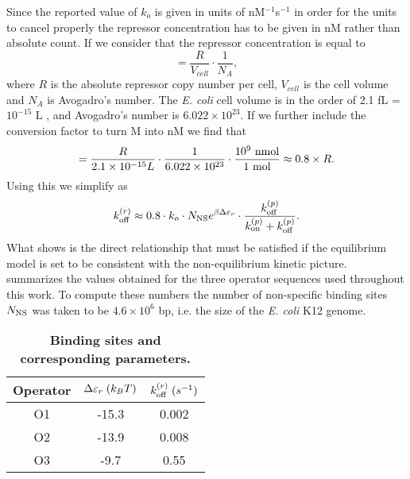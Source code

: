 Since the reported value of $k_o$ is given in units of nM$^{-1}$s$^{-1}$ in
order for the units to cancel properly the repressor concentration has to be
given in nM rather than absolute count. If we consider that the repressor
concentration is equal to
\begin{equation}
[R] = \frac{R}{V_{cell}}\cdot \frac{1}{N_A},
\end{equation}
where $R$ is the absolute repressor copy number per cell, $V_{cell}$ is the cell
volume and $N_A$ is Avogadro's number. The \textit{E. coli} cell volume is in
the order of 2.1 fL = $10^{-15}$ L \cite{Radzikowski2016}, and
Avogadro's number is $6.022 \times 10^{23}$. If we further include the
conversion factor to turn M into nM we find that
\begin{equation}
[R] = {R \over 2.1 \times 10^{-15} L} \cdot {1 \over 6.022 \times 10^{23}}
\cdot {10^9 \text{ nmol} \over 1 \text{ mol}} \approx 0.8 \times R.
\end{equation}
Using this we simplify  as
\begin{equation}
  k^{(r)}_{\text{off}} \approx 0.8 \cdot k_o \cdot N_\text{NS} e^{\beta\Delta\varepsilon_r}
   \cdot {k^{(p)}_{\text{off}}\over k^{(p)}_{\text{on}}+ k^{(p)}_{\text{off}}}.
  \label{seq_kroff}
\end{equation}
What  shows is the direct relationship that must be satisfied if
the equilibrium model is set to be consistent with the non-equilibrium kinetic
picture.  summarizes the values obtained for the three operator
sequences used throughout this work. To compute these numbers the number of
non-specific binding sites $N_\text{NS}$ was taken to be $4.6 \times 10^6$ bp, i.e. the
size of the {\it E. coli} K12 genome.

\begin{table}[]
  \caption{\textbf{Binding sites and corresponding parameters.}}
\begin{tabular}{|c|c|c|}
\hline
 Operator & $\Delta\varepsilon_r\; (k_BT)$ & $k^{(r)}_{\text{off}} \; (s^{-1})$  \\ \hline
 O1 & -15.3 & 0.002  \\ \hline
 O2 & -13.9 & 0.008  \\ \hline
 O3 & -9.7  & 0.55   \\ \hline
\end{tabular}
\label{stab_koff}
\end{table}

